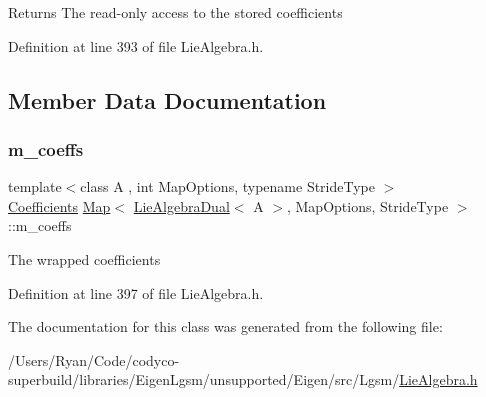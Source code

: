 \begin{DoxyReturn}{Returns}
The read-\/only access to the stored coefficients 
\end{DoxyReturn}


Definition at line 393 of file Lie\+Algebra.\+h.



\subsection{Member Data Documentation}
\hypertarget{class_map_3_01_lie_algebra_dual_3_01_a_01_4_00_01_map_options_00_01_stride_type_01_4_ac9091870e5a828077c30647d4d296c55}{}\label{class_map_3_01_lie_algebra_dual_3_01_a_01_4_00_01_map_options_00_01_stride_type_01_4_ac9091870e5a828077c30647d4d296c55} 
\subsubsection{\texorpdfstring{m\+\_\+coeffs}{m\_coeffs}}
{\footnotesize\ttfamily template$<$class A , int Map\+Options, typename Stride\+Type $>$ \\
\hyperlink{class_map_3_01_lie_algebra_dual_3_01_a_01_4_00_01_map_options_00_01_stride_type_01_4_ab39602ca662c12f4aa9031d05157fb73}{Coefficients} \hyperlink{class_map_3_01_lie_algebra_dual_3_01_a_01_4_00_01_map_options_00_01_stride_type_01_4_a343da7ed6d4069324cd174c8fa51a43f}{Map}$<$ \hyperlink{class_lie_algebra_dual}{Lie\+Algebra\+Dual}$<$ A $>$, Map\+Options, Stride\+Type $>$\+::m\+\_\+coeffs\hspace{0.3cm}{\ttfamily [protected]}}

The wrapped coefficients 

Definition at line 397 of file Lie\+Algebra.\+h.



The documentation for this class was generated from the following file\+:\begin{DoxyCompactItemize}
\item 
/\+Users/\+Ryan/\+Code/codyco-\/superbuild/libraries/\+Eigen\+Lgsm/unsupported/\+Eigen/src/\+Lgsm/\hyperlink{_lie_algebra_8h}{Lie\+Algebra.\+h}\end{DoxyCompactItemize}
